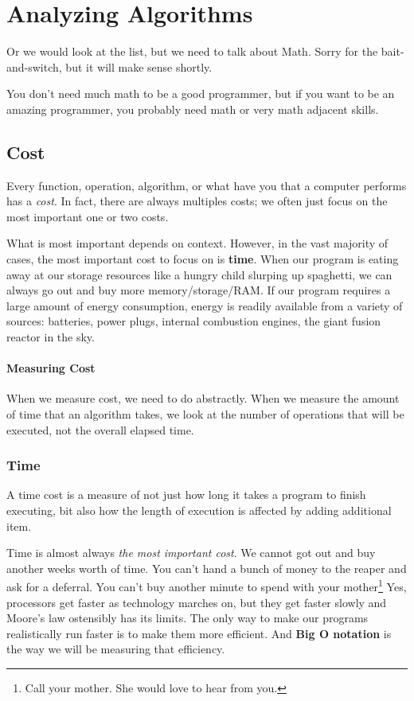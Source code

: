 \chapter{Analyzing Algorithms}
\label{chap:analysis}
Or we would look at the list, but we need to talk about Math.  Sorry for the bait-and-switch, but it will make sense shortly.

You don't need  much math to be a good programmer, but if you want to be an amazing programmer, you probably need math or very math adjacent skills.



\section{Cost}
Every function, operation, algorithm, or what have you that a computer performs has a \emph{cost}. 
In fact, there are always multiples costs;  we often just focus on the most important one or two costs.  

What is most important depends on context.
However, in the vast majority of cases, the most important cost to focus on is \textbf{time}.
When our program is eating away at our storage resources like a hungry child slurping up spaghetti, we can always go out and buy more memory/storage/RAM.
If our program requires a large amount of energy consumption, energy is readily available from a variety of sources: batteries, power plugs, internal combustion engines, the giant fusion reactor in the sky.


\subsubsection*{Measuring Cost}
When we measure cost, we need to do abstractly.  
When we measure the amount of time that an algorithm takes, we look at the number of operations that will be executed, not the overall elapsed time.

\subsection{Time}
A time cost is a measure of not just how long it takes a program to finish executing, bit also how the length of execution is affected by adding additional item.

Time is almost always \emph{the most important cost}. We cannot got out and buy another weeks worth of time.  You can't hand a bunch of money to the reaper and ask for a deferral. You can't buy another minute to spend with your mother\footnote{Call your mother.  She would love to hear from you.} 
Yes, processors get faster as technology marches on, but they get faster slowly and Moore's law ostensibly has its limits.
The only way to make our programs realistically run faster is to make them more efficient.  And \textbf{Big O notation} is the way we will be measuring that efficiency.


